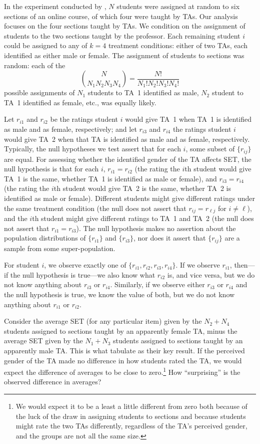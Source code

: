 \documentclass[12pt]{article}
\newcommand{\beq}{\begin{equation}}
\newcommand{\eeq}{\end{equation}}
\begin{document}
In the experiment conducted by \citet{MacNell2014},
$N$ students were assigned at random to six sections of an online course,
of which four were taught by TAs.
Our analysis focuses on the four sections taught by TAs.
We condition on the assignment of students to the two sections taught by the professor.
Each remaining student $i$ could be assigned to any of $k=4$ treatment conditions:
either of two TAs, each identified as either male or female.
The assignment of students to sections was random: each of the
\beq
 {{N}\choose{N_1 N_2 N_3 N_4}} = \frac{N!}{N_1! N_2! N_3! N_4!}
\eeq
possible assignments of $N_1$ students to TA~1 identified as male,
$N_2$ student to TA~1 identified as female, etc., was equally likely.

Let $r_{i1}$ and $r_{i2}$ be the ratings student $i$ would give TA~1 when 
TA~1 is identified as male and as female, respectively; and let 
$r_{i3}$ and $r_{i4}$ the ratings student $i$ would give TA~2 when that TA
is identified as male and as female, respectively.
Typically, the null hypotheses we test assert that for each $i$, some subset of
$\{r_{ij}\}$ are  equal.
For assessing whether the identified gender of the TA affects SET,
the null hypothesis is that for each $i$,
$r_{i1} = r_{i2}$ (the rating the $i$th student would give TA~1 is the same,
whether TA~1 is identified as male or female), 
and $r_{i3} = r_{i4}$ (the rating the $i$th student would give TA~2 is
the same, whether TA~2 is identified as male or female).
Different students might give different ratings under the same treatment condition
(the null does not assert that $r_{ij} = r_{\ell j}$ for $i \ne \ell$), and
the $i$th student might 
give different ratings to TA~1 and TA~2
(the null does not assert that $r_{i1} = r_{i3}$).
The null hypothesis makes no assertion about the population distributions of 
$\{r_{i1}\}$ and $\{r_{i3}\}$, nor does it assert that $\{r_{ij}\}$ are 
a sample from some super-population.

For student $i$, we observe exactly one of $\{r_{i1}, r_{i2}, r_{i3}, r_{i4}\}$.
If we observe $r_{i1}$, then---if the null hypothesis is true---we also know what $r_{i2}$ is,
and vice versa, but we do not know anything about $r_{i3}$ or $r_{i4}$.
Similarly, if we observe either $r_{i3}$ or $r_{i4}$ and the null hypothesis is true,
we know the value of both, but we do not know anything about $r_{i1}$ or $r_{i2}$.

Consider the average SET (for any particular item)
given by the $N_2 + N_4$ students
assigned to sections taught by an apparently female TA, minus the 
average SET given by the $N_1 + N_3$ students
assigned to sections taught by an apparently male TA.
This is what \cite{MacNell2014} tabulate as their key result.
If the perceived gender of the TA made no difference in how students rated 
the TA, we would expect the difference of averages to be close to
zero.\footnote{%
  We would expect it to be a least a little different from zero both because of the luck of the draw
  in assigning students to sections and because students might rate the two TAs
  differently, regardless of the TA's perceived gender, and the groups are not all the same size.
}
How ``surprising'' is the observed difference in averages?
\end{document}
